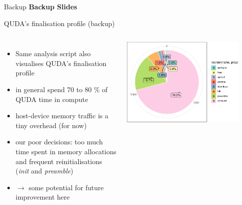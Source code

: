 \documentclass[xcolor={dvipsnames,table}]{beamer}
\begin{document}
\backupbegin

\begin{frame}{Backup}
  \centering
  \vspace{1.0cm}
  \textbf{Backup Slides}
\end{frame}

\begin{frame}{QUDA's finalisation profile (backup)}
  \begin{columns}
      \begin{itemize}
        \item Same analysis script also visualises QUDA's finalisation profile 
        \vspace{0.2cm}
        \item in general spend 70 to 80 \% of QUDA time in compute
        \vspace{0.2cm}
        \item host-device memory traffic is a tiny overhead (for now)
        \vspace{0.2cm}
        \item our poor decisions: too much time spent in memory allocations and frequent reinitialisations (\textit{init} and \textit{preamble})
        \vspace{0.2cm}
        \item $\rightarrow$ some potential for future improvement here
      \end{itemize}
      \vspace{0.1cm}
      \centering
      \includegraphics[width=0.89\textwidth]{quda_profile}
  \end{columns}
\end{frame}

\backupend
\end{document}
